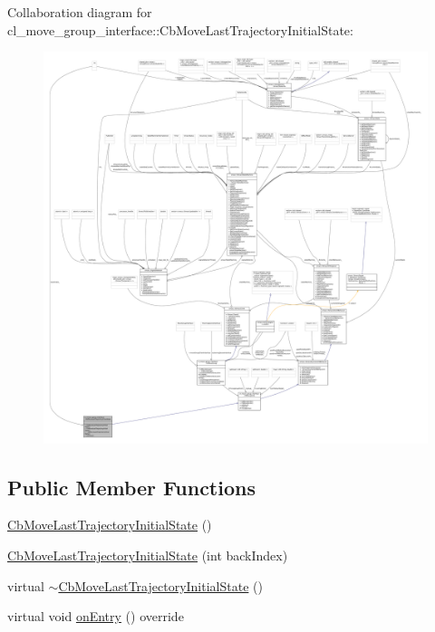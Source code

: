 Collaboration diagram for cl\+\_\+move\+\_\+group\+\_\+interface\+:\+:Cb\+Move\+Last\+Trajectory\+Initial\+State\+:
\nopagebreak
\begin{figure}[H]
\begin{center}
\leavevmode
\includegraphics[width=350pt]{classcl__move__group__interface_1_1CbMoveLastTrajectoryInitialState__coll__graph}
\end{center}
\end{figure}
\subsection*{Public Member Functions}
\begin{DoxyCompactItemize}
\item 
\hyperlink{classcl__move__group__interface_1_1CbMoveLastTrajectoryInitialState_afbd94e504bf292115bd331d8d0f76266}{Cb\+Move\+Last\+Trajectory\+Initial\+State} ()
\item 
\hyperlink{classcl__move__group__interface_1_1CbMoveLastTrajectoryInitialState_aebd2f666f92f9c0e3970f2a67b44233f}{Cb\+Move\+Last\+Trajectory\+Initial\+State} (int back\+Index)
\item 
virtual \hyperlink{classcl__move__group__interface_1_1CbMoveLastTrajectoryInitialState_a9774589e8b72e402d5bc8be37cd70a60}{$\sim$\+Cb\+Move\+Last\+Trajectory\+Initial\+State} ()
\item 
virtual void \hyperlink{classcl__move__group__interface_1_1CbMoveLastTrajectoryInitialState_ad51f4883ea1f7442875cda06c3d474c3}{on\+Entry} () override
\end{DoxyCompactItemize}
